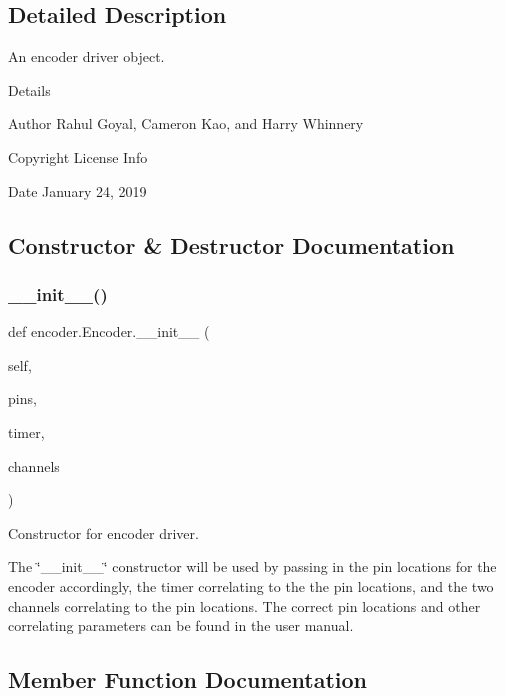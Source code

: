 \subsection{Detailed Description}
An encoder driver object. 

Details \begin{DoxyAuthor}{Author}
Rahul Goyal, Cameron Kao, and Harry Whinnery 
\end{DoxyAuthor}
\begin{DoxyCopyright}{Copyright}
License Info 
\end{DoxyCopyright}
\begin{DoxyDate}{Date}
January 24, 2019 
\end{DoxyDate}


\subsection{Constructor \& Destructor Documentation}
\mbox{\label{classencoder_1_1_encoder_a34939827412badc93f8744540676e833}} 
\subsubsection{\texorpdfstring{\_\_init\_\_()}{\_\_init\_\_()}}
{\footnotesize\ttfamily def encoder.\+Encoder.\+\_\+\+\_\+init\+\_\+\+\_\+ (\begin{DoxyParamCaption}\item[{}]{self,  }\item[{}]{pins,  }\item[{}]{timer,  }\item[{}]{channels }\end{DoxyParamCaption})}



Constructor for encoder driver. 

The \char`\"{}\+\_\+\+\_\+init\+\_\+\+\_\+\char`\"{} constructor will be used by passing in the pin locations for the encoder accordingly, the timer correlating to the the pin locations, and the two channels correlating to the pin locations. The correct pin locations and other correlating parameters can be found in the user manual. 

\subsection{Member Function Documentation}
\mbox{\label{classencoder_1_1_encoder_aa1c1535160682500f5214f45d8197027}} 

